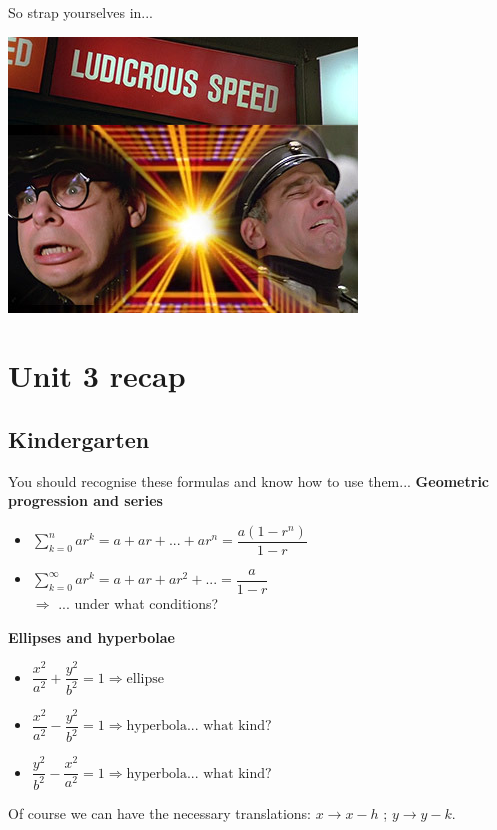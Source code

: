 \documentclass{beamer}
\begin{document}
\begin{frame}{So strap yourselves in...}
	\begin{center}
		\includegraphics[scale=0.80]{img/ludicrous_speed.jpg}
	\end{center}
	\end{frame}

\section{Unit 3 recap}

\subsection{Kindergarten}
\begin{frame}
	You should recognise these formulas and know how to use them...
	\textbf{Geometric progression and series}
	\begin{itemize}
		\item $\sum_{k = 0}^{n} ar^k = a + ar + ... + ar^n = \dfrac{a(1-r^n)}{1-r}$
		\item $\sum_{k = 0}^{\infty} ar^k = a + ar + ar^2 + ... = \dfrac{a}{1-r}$\\
		$\Rightarrow$ ... under what conditions?
	\end{itemize}
	\textbf{Ellipses and hyperbolae}
	\begin{itemize}
		\item $\dfrac{x^2}{a^2} + \dfrac{y^2}{b^2} = 1 \Rightarrow \text{ellipse}$
		\item $\dfrac{x^2}{a^2} - \dfrac{y^2}{b^2} = 1 \Rightarrow \text{hyperbola... what kind?}$
		\item $\dfrac{y^2}{b^2} - \dfrac{x^2}{a^2} = 1 \Rightarrow \text{hyperbola... what kind?}$
	\end{itemize}
	Of course we can have the necessary translations: $x \to x-h$ ; $y \to y-k$.
\end{frame}
\end{document}
